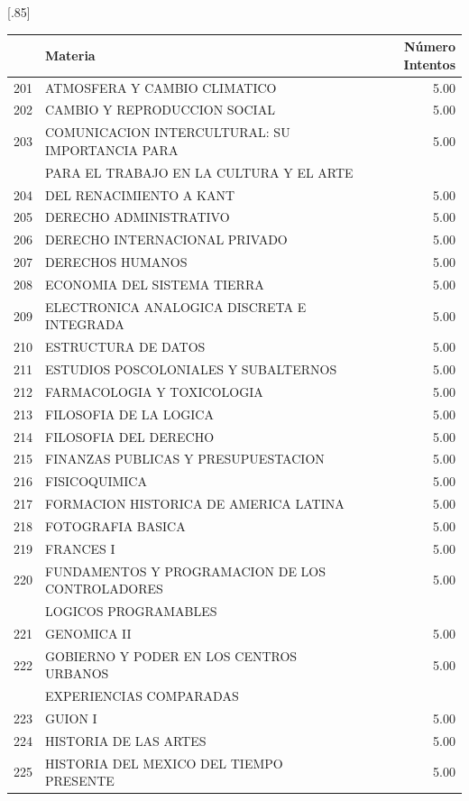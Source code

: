 \documentclass[12pt]{article}
\begin{document}
\begin{table}[ht]
\centering
\scalebox{0.75}[.85]{
\begin{tabular}{rlr}
  \hline
 & Materia & N\'umero Intentos\\ 
  \hline
  201 & ATMOSFERA Y CAMBIO CLIMATICO & 5.00 \\ 
  202 & CAMBIO Y REPRODUCCION SOCIAL & 5.00 \\ 
  203 & COMUNICACION INTERCULTURAL: SU IMPORTANCIA PARA  & 5.00 \\ 
  & PARA EL TRABAJO EN LA CULTURA Y EL ARTE & \\ 
  204 & DEL RENACIMIENTO A KANT & 5.00 \\ 
  205 & DERECHO ADMINISTRATIVO & 5.00 \\ 
  206 & DERECHO INTERNACIONAL PRIVADO & 5.00 \\ 
  207 & DERECHOS HUMANOS & 5.00 \\ 
  208 & ECONOMIA DEL SISTEMA TIERRA & 5.00 \\ 
  209 & ELECTRONICA ANALOGICA DISCRETA E INTEGRADA & 5.00 \\ 
  210 & ESTRUCTURA DE DATOS & 5.00 \\ 
  211 & ESTUDIOS POSCOLONIALES Y SUBALTERNOS & 5.00 \\ 
  212 & FARMACOLOGIA Y TOXICOLOGIA & 5.00 \\ 
  213 & FILOSOFIA DE LA LOGICA & 5.00 \\ 
  214 & FILOSOFIA DEL DERECHO & 5.00 \\ 
  215 & FINANZAS PUBLICAS Y PRESUPUESTACION & 5.00 \\ 
  216 & FISICOQUIMICA & 5.00 \\ 
  217 & FORMACION HISTORICA DE AMERICA LATINA & 5.00 \\ 
  218 & FOTOGRAFIA BASICA & 5.00 \\ 
  219 & FRANCES I & 5.00 \\ 
  220 & FUNDAMENTOS Y PROGRAMACION DE LOS CONTROLADORES& 5.00 \\ 
   & LOGICOS PROGRAMABLES &  \\ 
  221 & GENOMICA II & 5.00 \\ 
  222 & GOBIERNO Y PODER EN LOS CENTROS URBANOS & 5.00 \\ 
  &  EXPERIENCIAS COMPARADAS &  \\ 
  223 & GUION I & 5.00 \\ 
  224 & HISTORIA DE LAS ARTES & 5.00 \\ 
  225 & HISTORIA DEL MEXICO DEL TIEMPO PRESENTE & 5.00 \\ 

\end{tabular}}
\end{table}
\end{document}
